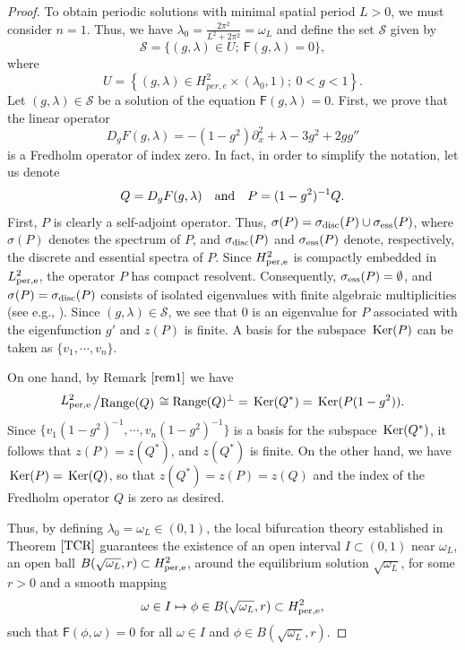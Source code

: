 \documentclass[12pt,reqno]{amsart}
\newcommand{\Ker}{{\rm \,Ker}}
\newcommand{\bigslant}[2]{{\raisebox{.1em}{$#1$}\left/\raisebox{-.1em}{$#2$}\right.}}
\numberwithin{equation}{section}
\numberwithin{figure}{section}
\begin{document}
\begin{proof}
To obtain periodic solutions with minimal spatial period $L > 0$, we must consider $n=1$. Thus, we have $\lambda_0 = \frac{2 \pi^2}{L^2 + 2 \pi^2} = \omega_L$ and define the set $\mathcal{S}$ given by 
		$$
		\mathcal{S}=\{(g,\lambda)\in U;\ \mathsf{F}(g,\lambda)=0\},
		$$
		where 
			$$
			U=\left\{(g,\lambda)\in H_{per,e}^2\times \left(\lambda_0,1\right);\ 0<g<1\right\}.
			$$			
Let $(g, \lambda) \in \mathcal{S}$ be a solution of the equation $\mathsf{F}(g, \lambda) = 0$. First, we prove that the linear operator
$$
D_gF(g,\lambda)=-(1-g^2)\partial_x^2+\lambda-3g^2+2gg''
$$ 
is a Fredholm operator of index zero. In fact, in order to simplify the notation, let us denote 
$$
Q = D_gF(g,\lambda) \quad \mbox{\rm and} \quad P=(1-g^2)^{-1}Q.
$$ 
First, $P$ is clearly a self-adjoint operator. Thus,
$\sigma(P)=\sigma_{\rm disc}(P)\cup \sigma_{\rm ess}(P)$,  where $\sigma(P)$
denotes the spectrum of  $P$, and  $\sigma_{\rm disc}(P)$ and $\sigma_{\rm ess}(P)$
denote, respectively, the discrete and essential spectra of  $P$. Since $H^2_{\rm per,e}$ is compactly embedded in $L^2_{\rm per,e}$, the operator $P$ has compact resolvent. Consequently, $\sigma_{\rm ess}(P) = \emptyset$, and $\sigma(P)=\sigma_{\rm disc}(P)$ consists of isolated eigenvalues with finite algebraic multiplicities (see e.g., \cite[Section III.6]{kato}). Since $(g,\lambda)\in \mathcal{S}$, we see that $0$ is an eigenvalue for $P$ associated with the eigenfunction $g'$ and $z(P)$ is finite. A basis for the subspace $\Ker(P)$  can be taken as $\{v_1,\cdots,v_n\}$. 

On one hand, by Remark $\ref{rem1}$ we have 
$$
\bigslant{L_{\rm per,e}^2}{{\rm Range}(Q)}\cong {\rm Range}(Q)^{\bot}=\Ker(Q^{*})=\Ker(P(1-g^2)).
$$ 
Since $\{v_1(1-g^2)^{-1},\cdots,v_n(1-g^2)^{-1}\}$ is a basis for the subspace $\Ker(Q^{*})$, it follows that $z(P)=z(Q^{*})$, and $z(Q^{*})$ is finite. On the other hand, we have $\Ker(P)=\Ker(Q)$, so that $z(Q^{*})=z(P)=z(Q)$ and the index of the Fredholm operator $Q$ is zero as desired.

Thus, by defining $\lambda_0=\omega_L \in (0,1)$, the local bifurcation theory established in Theorem $\ref{TCR}$ guarantees the existence of an open interval $I\subset (0,1)$ near $\omega_L$, an open ball $B(\sqrt{\omega_L},r) \subset H_{\rm per,e}^{2}$, around the equilibrium solution $\sqrt{\omega_L}$, for some $r>0$ and a  smooth mapping
			\begin{equation}
			\label{localcurve}\omega \in I \mapsto \phi \in B(\sqrt{\omega_L},r) \subset H_{\rm per,e}^{2},
			\end{equation}
			such that $\mathsf{F}(\phi,\omega) = 0$ for all $\omega \in I$ and $\phi\in B(\sqrt{\omega_L},r)$.


\end{proof}
\end{document}
